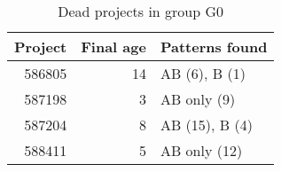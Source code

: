 \begin{table}[H]
\caption{Dead projects in group G0}\label{table:deads_g0}
\centering
\begin{tabular}{rrl}
\hline
	\textbf{Project} & \textbf{Final age} & \textbf{Patterns found} \\
	\hline
	586805 & 14 & AB (6), B (1) \\
	587198 & 3 & AB only (9) \\
	587204 & 8 & AB (15), B (4) \\
	588411 & 5 & AB only (12) \\
\hline
\end{tabular}
\end{table}